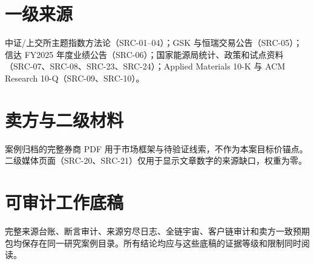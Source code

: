 \small
\section*{一级来源}
中证/上交所主题指数方法论（SRC-01--04）；GSK 与恒瑞交易公告（SRC-05）；信达 FY2025 年度业绩公告（SRC-06）；国家能源局统计、政策和试点资料（SRC-07、SRC-08、SRC-23、SRC-24）；Applied Materials 10-K 与 ACM Research 10-Q（SRC-09、SRC-10）。

\section*{卖方与二级材料}
案例归档的完整券商 PDF 用于市场框架与待验证线索，不作为本案目标价锚点。二级媒体页面（SRC-20、SRC-21）仅用于显示文章数字的来源缺口，权重为零。

\section*{可审计工作底稿}
完整来源台账、断言审计、来源穷尽日志、全链宇宙、客户链审计和卖方一致预期包均保存在同一研究案例目录。所有结论均应与这些底稿的证据等级和限制同时阅读。

